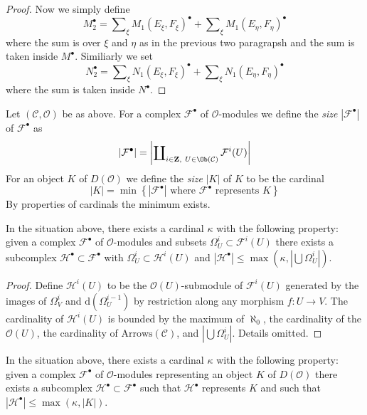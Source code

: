 \begin{proof}
\medskip\noindent
Now we simply define
$$
M_2^\bullet =
\sum\nolimits_\xi M_1(E_\xi, F_\xi)^\bullet +
\sum\nolimits_\xi M_1(E_\eta, F_\eta)^\bullet
$$
where the sum is over $\xi$ and $\eta$ as in the previous two paragrapsh
and the sum is taken inside $M^\bullet$. Similiarly we set
$$
N_2^\bullet =
\sum\nolimits_\xi N_1(E_\xi, F_\xi)^\bullet +
\sum\nolimits_\xi N_1(E_\eta, F_\eta)^\bullet
$$
where the sum is taken inside $N^\bullet$.
\end{proof}

\noindent
Let $(\mathcal{C}, \mathcal{O})$ be as above. For a complex
$\mathcal{F}^\bullet$ of $\mathcal{O}$-modules we define the
{\it size} $|\mathcal{F}^\bullet|$ of $\mathcal{F}^\bullet$ as
$$
|\mathcal{F}^\bullet| =
\left|
\coprod\nolimits_{i \in \mathbf{Z},\ U \in \Ob(\mathcal{C})} \mathcal{F}^i(U)
\right|
$$
For an object $K$ of
$D(\mathcal{O})$ we define the {\it size} $|K|$ of $K$ to be the
cardinal
$$
|K| = \min
\left\{
\left|
\mathcal{F}^\bullet
\right|
\text{ where }\mathcal{F}^\bullet\text{ represents }K
\right\}
$$
By properties of cardinals the minimum exists.

\begin{lemma}
\label{lemma-build-from}
In the situation above, there exists a cardinal $\kappa$ with the
following property: given a complex $\mathcal{F}^\bullet$ of
$\mathcal{O}$-modules and subsets $\Omega^i_U \subset \mathcal{F}^i(U)$
there exists a subcomplex $\mathcal{H}^\bullet \subset \mathcal{F}^\bullet$
with $\Omega^i_U \subset \mathcal{H}^i(U)$ and
$|\mathcal{H}^\bullet| \leq \max(\kappa, |\bigcup \Omega^i_U|)$.
\end{lemma}

\begin{proof}
Define $\mathcal{H}^i(U)$ to be the
$\mathcal{O}(U)$-submodule of $\mathcal{F}^i(U)$
generated by the images of $\Omega^i_V$ and $\text{d}(\Omega^{i - 1}_U)$
by restriction along any morphism $f : U \to V$.
The cardinality of $\mathcal{H}^i(U)$ is bounded
by the maximum of $\aleph_0$, the cardinality of the $\mathcal{O}(U)$,
the cardinality of $\text{Arrows}(\mathcal{C})$, and $|\bigcup \Omega^i_U|$.
Details omitted.
\end{proof}

\begin{lemma}
\label{lemma-qis-small}
In the situation above, there exists a cardinal $\kappa$ with the
following property: given a complex $\mathcal{F}^\bullet$ of
$\mathcal{O}$-modules representing an object $K$ of $D(\mathcal{O})$
there exists a subcomplex $\mathcal{H}^\bullet \subset \mathcal{F}^\bullet$
such that $\mathcal{H}^\bullet$ represents $K$ and such that
$|\mathcal{H}^\bullet| \leq \max(\kappa, |K|)$.
\end{lemma}

